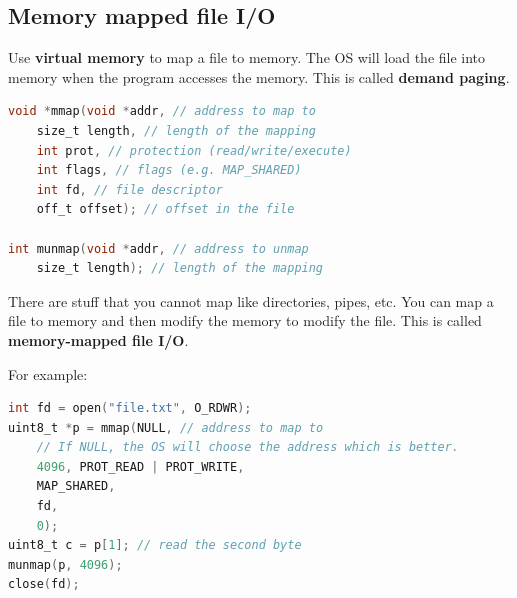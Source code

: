 \documentclass[letterpaper,12pt]{article}
\begin{document}
\subsection{Memory mapped file I/O}
Use \textbf{virtual memory} to map a file to memory. The OS will load the file into memory when the program accesses the memory. This is called \textbf{demand paging}.
\begin{lstlisting}[language=C]
void *mmap(void *addr, // address to map to
    size_t length, // length of the mapping
    int prot, // protection (read/write/execute)
    int flags, // flags (e.g. MAP_SHARED)
    int fd, // file descriptor
    off_t offset); // offset in the file

int munmap(void *addr, // address to unmap
    size_t length); // length of the mapping
\end{lstlisting}
There are stuff that you cannot map like directories, pipes, etc. You can map a file to memory and then modify the memory to modify the file. This is called \textbf{memory-mapped file I/O}.

For example: \begin{lstlisting}[language=C]
int fd = open("file.txt", O_RDWR);
uint8_t *p = mmap(NULL, // address to map to
    // If NULL, the OS will choose the address which is better.
    4096, PROT_READ | PROT_WRITE, 
    MAP_SHARED, 
    fd, 
    0);
uint8_t c = p[1]; // read the second byte
munmap(p, 4096);
close(fd);
\end{lstlisting}
\end{document}
